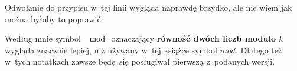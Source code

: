 \documentclass[a4paper,11pt]{article}
\begin{document}
 Odwołanie do przypisu w~tej linii wygląda naprawdę brzydko, 
ale nie wiem jak można byłoby to poprawić.

\vspace{\spaceFour}





 Według mnie symbol $\mod$ oznaczający \textbf{równość dwóch liczb modulo $k$}
wygląda znacznie lepiej, niż używany w~tej książce symbol $mod$. Dlatego też w~tych notatkach
zawsze będę~się posługiwał pierwszą z~podanych wersji.

\vspace{\spaceFour}










\newpage


\vspace{\spaceFive}
\end{document}
